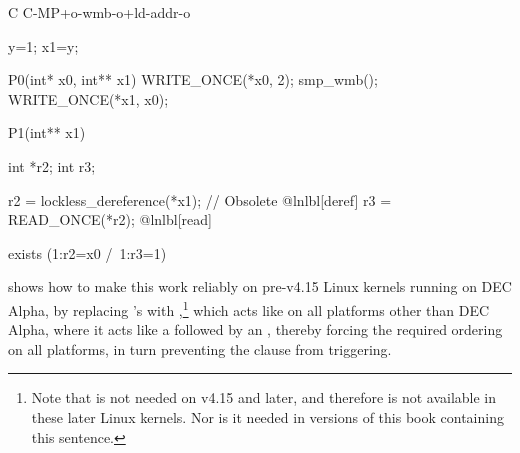 \begin{listing}[tbp]
\begin{fcvlabel}
\begin{VerbatimL}[commandchars=\@\[\]]
C C-MP+o-wmb-o+ld-addr-o

{
y=1;
x1=y;
}

P0(int* x0, int** x1) {
	WRITE_ONCE(*x0, 2);
	smp_wmb();
	WRITE_ONCE(*x1, x0);
}

P1(int** x1) {
	int *r2;
	int r3;

	r2 = lockless_dereference(*x1); // Obsolete @lnlbl[deref]
	r3 = READ_ONCE(*r2);			    @lnlbl[read]
}

exists (1:r2=x0 /\ 1:r3=1)
\end{VerbatimL}
\end{fcvlabel}
\caption{Enforced Ordering of Message-Passing Address-Dependency Litmus Test (Before v4.15)}
\label{lst:memorder:Enforced Ordering of Message-Passing Address-Dependency Litmus Test (Before v4.15)}
\end{listing}

\begin{fcvref}
shows how to make this work reliably on pre-v4.15 Linux kernels running on
DEC Alpha, by replacing 's  with
,\footnote{
	Note that  is not needed on v4.15 and
	later, and therefore is not available in these later Linux kernels.
	Nor is it needed in versions of this book containing this sentence.}
which acts like  on all platforms other than DEC Alpha,
where it acts like a  followed by an ,
thereby forcing the required ordering on all platforms, in turn
preventing the  clause from triggering.
\end{fcvref}

\begin{listing}[tbp]

\caption{S Address-Dependency Litmus Test}
\label{lst:memorder:S Address-Dependency Litmus Test}
\end{listing}

